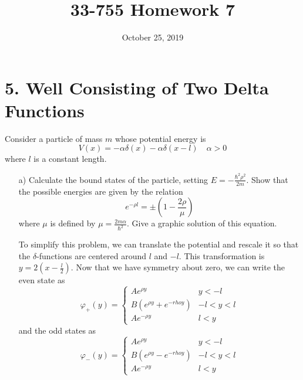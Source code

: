 \documentclass[a4paper,twoside]{article}
\title{33-755 Homework 7}
\date{October 25, 2019}
\begin{document}
\maketitle

\section*{5. Well Consisting of Two Delta Functions}
Consider a particle of mass $ m $ whose potential energy is
\begin{equation}
    V(x) = - \alpha \delta(x) - \alpha \delta(x - l) \quad \alpha > 0
\end{equation}
where $ l $ is a constant length.
\begin{itemize}
    \item[a)] Calculate the bound states of the particle, setting $ E = - \frac{\hbar^2 \rho^2}{2m} $. Show that the possible energies are given by the relation
    \begin{equation}
        e^{- \rho l} = \pm \left( 1 - \frac{2 \rho}{\mu} \right)
    \end{equation}
    where $\mu$ is defined by $ \mu = \frac{2m \alpha}{\hbar^2} $. Give a graphic solution of this equation.
    \begin{problem}
        To simplify this problem, we can translate the potential and rescale it so that the $\delta$-functions are centered around $ l $ and $ -l $. This transformation is $ y = 2(x - \frac{l}{2}) $. Now that we have symmetry about zero, we can write the even state as
        \begin{equation}
            \varphi_+(y) =
            \begin{cases}
                A e^{\rho y} & y < -l\\
                B(e^{\rho y} + e^{-rho y}) & -l < y < l\\
                A e^{- \rho y} & l < y
            \end{cases}
        \end{equation}
        and the odd states as
        \begin{equation}
            \varphi_-(y) =
            \begin{cases}
                A e^{\rho y} & y < -l\\
                B(e^{\rho y} - e^{-rho y}) & -l < y < l\\
                A e^{- \rho y} & l < y
            \end{cases}
        \end{equation}

\end{problem}
\end{itemize}
\end{document}
